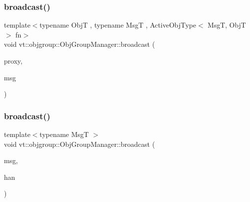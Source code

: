 \subsubsection{\texorpdfstring{broadcast()}{broadcast()}\hspace{0.1cm}{\footnotesize\ttfamily [1/2]}}
{\footnotesize\ttfamily template$<$typename ObjT , typename MsgT , Active\+Obj\+Type$<$ Msg\+T, Obj\+T $>$ fn$>$ \\
void vt\+::objgroup\+::\+Obj\+Group\+Manager\+::broadcast (\begin{DoxyParamCaption}\item[{\hyperlink{structvt_1_1objgroup_1_1_obj_group_manager_aea65eef52f240a52210132eef5ce591f}{Proxy\+Type}$<$ ObjT $>$}]{proxy,  }\item[{\hyperlink{namespacevt_ab2b3d506ec8e8d1540aede826d84a239}{Msg\+Shared\+Ptr}$<$ MsgT $>$}]{msg }\end{DoxyParamCaption})}

\mbox{\label{structvt_1_1objgroup_1_1_obj_group_manager_a4bd17271d7a5d298ac74c73eedde4d8d}} 
\subsubsection{\texorpdfstring{broadcast()}{broadcast()}\hspace{0.1cm}{\footnotesize\ttfamily [2/2]}}
{\footnotesize\ttfamily template$<$typename MsgT $>$ \\
void vt\+::objgroup\+::\+Obj\+Group\+Manager\+::broadcast (\begin{DoxyParamCaption}\item[{\hyperlink{namespacevt_ab2b3d506ec8e8d1540aede826d84a239}{Msg\+Shared\+Ptr}$<$ MsgT $>$}]{msg,  }\item[{\hyperlink{namespacevt_af64846b57dfcaf104da3ef6967917573}{Handler\+Type}}]{han }\end{DoxyParamCaption})}

\mbox{\label{structvt_1_1objgroup_1_1_obj_group_manager_ad02bff10088a4f8e453cf24bd832308c}} 
